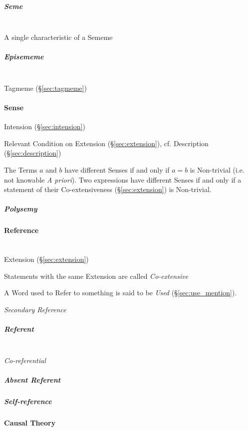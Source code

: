 \subparagraph{Seme}\label{sec:seme}
\hfill \\

A single characteristic of a Sememe



\subparagraph{Episememe}\label{sec:episememe}
\hfill \\

Tagmeme (\S\ref{sec:tagmeme})



\paragraph{Sense}\label{sec:sense}
\cite{chalmers02}

Intension (\S\ref{sec:intension})

Relevant Condition on Extension (\S\ref{sec:extension}), cf.
Description (\S\ref{sec:description})

The Terms $a$ and $b$ have different Senses if and only if $a = b$ is
Non-trivial (i.e. not knowable \emph{A priori}). Two expressions have
different Senses if and only if a statement of their Co-extensiveness
(\S\ref{sec:extension}) is Non-trivial.

\subparagraph{Polysemy}\label{sec:polysemy}



\paragraph{Reference}\label{sec:reference}
\hfill \\

Extension (\S\ref{sec:extension})

Statements with the same Extension are called \emph{Co-extensive}

A Word used to Refer to something is said to be \emph{Used}
(\S\ref{sec:use_mention}).

\emph{Secondary Reference}

\subparagraph{Referent}\label{sec:referent}
\hfill \\

\emph{Co-referential}

\subparagraph{Absent Referent}\label{sec:absent_referent}

\subparagraph{Self-reference}\label{sec:self_reference}



\paragraph{Causal Theory}\label{sec:causal_reference}

